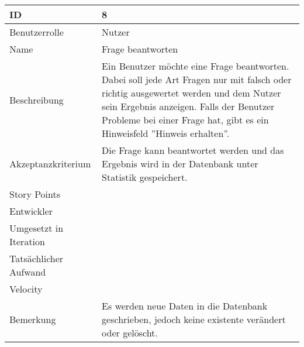 \begin{tabularx}{\textwidth}{|p{}|X|}
	\hline
	ID & 8\\
	\hline
	Benutzerrolle & Nutzer\\
	\hline
	Name & Frage beantworten\\
	\hline
	Beschreibung & Ein Benutzer möchte eine Frage beantworten. Dabei soll jede Art Fragen nur mit falsch oder richtig ausgewertet werden und dem Nutzer sein Ergebnis anzeigen. Falls der Benutzer Probleme bei einer Frage hat, gibt es ein Hinweisfeld ''Hinweis erhalten''.\\
	\hline
	Akzeptanzkriterium & Die Frage kann beantwortet werden und das Ergebnis wird in der Datenbank unter Statistik gespeichert.\\
	\hline
	Story Points & \\
	\hline
	Entwickler & \\
	\hline
	Umgesetzt in Iteration & \\
	\hline
	Tatsächlicher Aufwand & \\
	\hline
	Velocity & \\
	\hline
	Bemerkung & Es werden neue Daten in die Datenbank geschrieben, jedoch keine existente verändert oder gelöscht.\\
	\hline
\end{tabularx}
\vspace{20pt}
